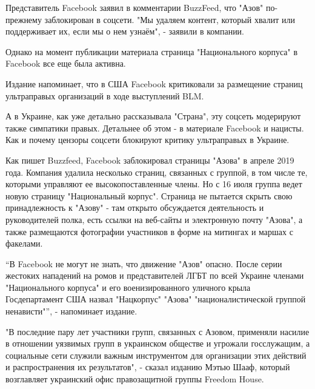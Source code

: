 Представитель Facebook заявил в комментарии BuzzFeed, что "Азов" по-прежнему
заблокирован в соцсети. "Мы удаляем контент, который хвалит или поддерживает
их, если мы о нем узнаём", - заявили в компании.

Однако на момент публикации материала страница "Национального корпуса" в
Facebook все еще была активна.

Издание напоминает, что в США Facebook критиковали за размещение страниц
ультраправых организаций в ходе выступлений BLM.

А в Украине, как уже детально рассказывала "Страна", эту соцсеть модерируют
также симпатики правых. Детальнее об этом - в материале Facebook и нацисты. Как
и почему цензоры соцсети блокируют критику ультраправых в Украине.

Как пишет Buzzfeed, Facebook заблокировал страницы "Азова" в апреле 2019 года.
Компания удалила несколько страниц, связанных с группой, в том числе те,
которыми управляют ее высокопоставленные члены. Но с 16 июля группа ведет новую
страницу "Национальный корпус". Страница не пытается скрыть свою принадлежность
к "Азову" - там открыто обсуждается деятельность и руководителей полка, есть
ссылки на веб-сайты и электронную почту "Азова", а также размещаются фотографии
участников в форме на митингах и маршах с факелами.

\enquote{В Facebook не могут не знать, что движение "Азов" опасно. После серии жестоких
нападений на ромов и представителей ЛГБТ по всей Украине членами "Национального
корпуса" и его военизированного уличного крыла Госдепартамент США назвал
"Нацкорпус" "Азова" "националистической группой ненависти"}, - напоминает
издание.

"В последние пару лет участники групп, связанных с Азовом, применяли насилие в
отношении уязвимых групп в украинском обществе и угрожали госслужащим, а
социальные сети служили важным инструментом для организации этих действий и
распространения их результатов", - сказал изданию Мэтью Шааф, который
возглавляет украинский офис правозащитной группы Freedom House.

 
